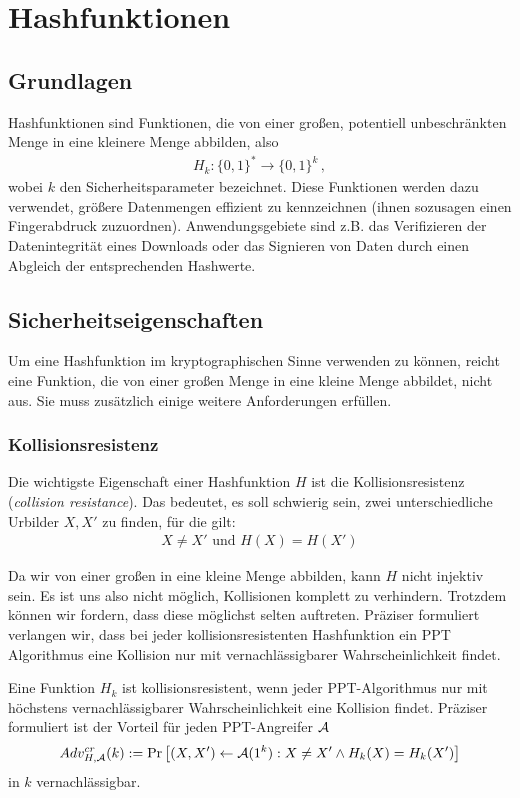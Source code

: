 \chapter{Hashfunktionen}\label{cha:hash}
\section{Grundlagen}
Hashfunktionen sind Funktionen, die von einer großen, potentiell unbeschränkten Menge in eine kleinere Menge abbilden, also
\begin{align*}
H_k\colon \{0,1\}^* \rightarrow \{0,1\}^k\, ,
\end{align*}
wobei $k$ den Sicherheitsparameter bezeichnet. %
Diese Funktionen werden dazu verwendet, größere Datenmengen effizient zu kennzeichnen (ihnen sozusagen einen Fingerabdruck zuzuordnen). Anwendungsgebiete sind
z.B. das Verifizieren der Datenintegrität eines Downloads oder das Signieren von Daten durch einen Abgleich der entsprechenden Hashwerte.

\section{Sicherheitseigenschaften}

Um eine Hashfunktion im kryptographischen Sinne verwenden zu können, reicht eine Funktion, die von einer großen Menge in eine kleine Menge abbildet, nicht aus.
Sie muss zusätzlich einige weitere Anforderungen erfüllen.

\subsection{Kollisionsresistenz}
Die wichtigste Eigenschaft einer Hashfunktion $H$ ist die Kollisionsresistenz (\textit{collision resistance}). Das bedeutet, es soll schwierig sein, zwei
unterschiedliche Urbilder $X, X'$ zu finden, für die gilt: 
\begin{align*}
X \neq X' \text{ und } H(X) = H(X')
\end{align*}

Da wir von einer großen in eine kleine Menge abbilden, kann $H$ nicht injektiv sein. Es ist uns also nicht möglich, Kollisionen komplett zu
verhindern. Trotzdem können wir fordern, dass diese möglichst selten auftreten. Präziser formuliert verlangen wir, dass bei jeder
kollisionsresistenten Hashfunktion ein PPT Algorithmus eine Kollision nur mit vernachlässigbarer Wahrscheinlichkeit findet.
\begin{definition}[Kollisionsresistenz]
Eine Funktion $H_k$ ist kollisionsresistent, wenn jeder PPT-Algorithmus nur mit höchstens vernachlässigbarer Wahrscheinlichkeit eine Kollision findet.
Präziser formuliert ist der Vorteil für jeden PPT-Angreifer $\mathcal{A}$
\begin{align*}
Adv^{cr}_{H,\mathcal{A}}(k):= \Pr \left[ (X, X') \leftarrow \mathcal{A}(1^k) : X \neq X' \land H_k(X) = H_k(X')\right]
\end{align*}
in $k$ vernachlässigbar.
\end{definition}

